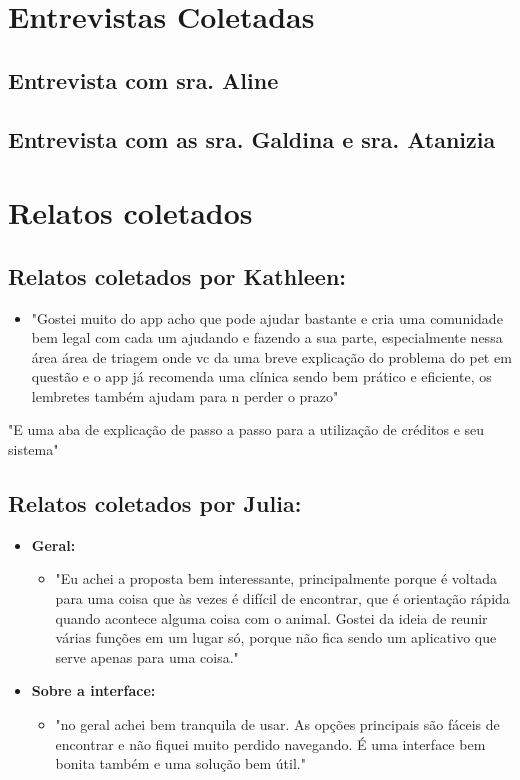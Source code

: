 


\section{Entrevistas Coletadas}
\subsection{Entrevista com sra. Aline}


\subsection{Entrevista com as sra. Galdina e sra. Atanizia}


\section{Relatos coletados}
\subsection{Relatos coletados por Kathleen:}

\begin{itemize}
\item "Gostei muito do app acho que pode ajudar bastante e cria uma comunidade bem legal com cada um ajudando e fazendo a sua parte, especialmente nessa área área de triagem onde vc da uma breve explicação do problema do pet em questão e o app já recomenda uma clínica sendo bem prático e eficiente, os lembretes também ajudam para n perder o prazo"
\end{itemize}


"E uma aba de explicação de passo a passo para a utilização de créditos e seu sistema"

\subsection{Relatos coletados por Julia:}
\begin{itemize}
\item \textbf{Geral:}

\begin{itemize}
\item "Eu achei a proposta bem interessante, principalmente porque é voltada para uma coisa que às vezes é difícil de encontrar, que é orientação rápida quando acontece alguma coisa com o animal. Gostei da ideia de reunir várias funções em um lugar só, porque não fica sendo um aplicativo que serve apenas para uma coisa."
\end{itemize}
\item \textbf{Sobre a interface:}

\begin{itemize}
\item"no geral achei bem tranquila de usar. As opções principais são fáceis de encontrar e não fiquei muito perdido navegando. É uma interface bem bonita também e uma solução bem útil."
\end{itemize}
\end{itemize}
